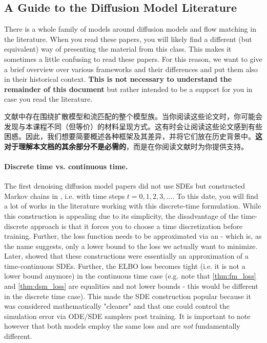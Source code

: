 \subsection{A Guide to the  Diffusion Model Literature}
\label{subsec:guide_to_flow_matching_literature}

There is a whole family of models around diffusion models and flow matching in the literature. When you read these papers, you will likely find a different (but equivalent) way of presenting the material from this class. This makes it sometimes a little confusing to read these papers. For this reason, we want to give a brief overview over various frameworks and their differences and put them also in their historical context. \textbf{This is not necessary to understand the remainder of this document} but rather intended to be a support for you in case you read the literature.

文献中存在围绕扩散模型和流匹配的整个模型族。当你阅读这些论文时，你可能会发现与本课程不同（但等价）的材料呈现方式。这有时会让阅读这些论文感到有些困惑。因此，我们想要简要概述各种框架及其差异，并将它们放在历史背景中。\textbf{这对于理解本文档的其余部分不是必需的}，而是在你阅读文献时为你提供支持。

\paragraph{Discrete time vs. continuous time.} The first denoising diffusion model papers \citep{sohl2015deep, song2019generative, ho2020denoising} did not use SDEs but constructed Markov chains in , i.e. with time steps $t=0,1,2,3,\dots$. To this date, you will find a lot of works in the literature working with this discrete-time formulation. While this construction is appealing due to its simplicity, the disadvantage of the time-discrete approach is that it forces you to choose a time discretization before training. Further, the loss function needs to be approximated via an  - which is, as the name suggests, only a lower bound to the loss we actually want to minimize. Later, \citet{song2020score} showed that these constructions were essentially an approximation of a time-continuous SDEs. Further, the ELBO loss becomes tight (i.e. it is not a lower bound anymore) in the continuous time case (e.g. note that \cref{thm:fm_loss} and \cref{thm:dsm_loss} are equalities and not lower bounds - this would be different in the discrete time case). This made the SDE construction popular because it was considered mathematically "cleaner" and that one could control the simulation error via ODE/SDE samplers post training. It is important to note however that both models employ the same loss and are \textit{not} fundamentally different.

